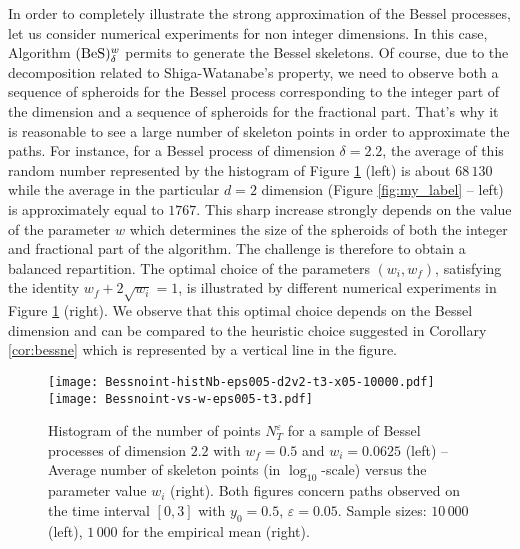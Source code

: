 \documentclass[12pt]{article}
\numberwithin{equation}{section}
\begin{document}
In order to completely illustrate the strong approximation of the Bessel processes, let us consider numerical experiments for non integer dimensions. In this case,  Algorithm $({\rm BeS})_\delta^w$ permits to generate the Bessel skeletons. Of course, due to the decomposition related to Shiga-Watanabe's property, we need to observe both a sequence of spheroids for the Bessel process corresponding to the integer part of the dimension and a sequence of spheroids for the fractional part. That's why it is reasonable to see a large number of skeleton points in order to approximate the paths. For instance, for a Bessel process of dimension $\delta=2.2$, the average of this random number represented by the histogram of Figure \ref{fig:my_label:bis} (left) is about  $68\,130$ 
 while the average in the particular $d=2$ dimension (Figure \ref{fig:my_label} -- left) is approximately equal to $1767$. This sharp increase strongly depends on the value of the parameter $w$ which determines the size of the spheroids of both the integer and fractional part of the algorithm. The challenge is therefore to obtain a balanced repartition. The optimal choice of the parameters $(w_i, w_f)$, satisfying the identity $w_f+2\sqrt{w_i}=1$, is illustrated by different numerical experiments in Figure \ref{fig:my_label:bis} (right). We observe that this optimal choice depends on the Bessel dimension and can be compared to the heuristic choice suggested in Corollary \ref{cor:bessne} which is represented by a vertical line in the figure.


\begin{figure}[h]
\centering
\texttt{[image: Bessnoint-histNb-eps005-d2v2-t3-x05-10000.pdf]}\hspace*{-0.5cm}\texttt{[image: Bessnoint-vs-w-eps005-t3.pdf]}
\caption{\small Histogram of the number of points $N_T^\varepsilon$ for a sample of Bessel processes of dimension $2.2$  with $w_f=0.5$ and $w_i=0.0625$ (left) -- Average number of skeleton points (in $\log_{10}$-scale) versus the parameter value $w_i$ (right). Both figures concern paths observed on the time interval $[0,3]$ with $y_0=0.5$, $\varepsilon=0.05$. Sample sizes: $10\,000$ (left), $1\,000$ for the empirical mean (right).}
\label{fig:my_label:bis}
\end{figure}
\end{document}
